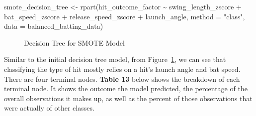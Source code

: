 \documentclass[
  letterpaper,
  DIV=11,
  numbers=noendperiod]{scrartcl}
\newenvironment{Shaded}{\begin{snugshade}}{\end{snugshade}}
\newcommand{\AttributeTok}[1]{\textcolor[rgb]{0.40,0.45,0.13}{#1}}
\newcommand{\FunctionTok}[1]{\textcolor[rgb]{0.28,0.35,0.67}{#1}}
\newcommand{\NormalTok}[1]{\textcolor[rgb]{0.00,0.23,0.31}{#1}}
\newcommand{\OtherTok}[1]{\textcolor[rgb]{0.00,0.23,0.31}{#1}}
\newcommand{\SpecialCharTok}[1]{\textcolor[rgb]{0.37,0.37,0.37}{#1}}
\newcommand{\StringTok}[1]{\textcolor[rgb]{0.13,0.47,0.30}{#1}}
\begin{document}
\begin{Shaded}
\begin{Highlighting}[]
\NormalTok{smote\_decision\_tree }\OtherTok{\textless{}{-}} \FunctionTok{rpart}\NormalTok{(hit\_outcome\_factor }\SpecialCharTok{\textasciitilde{}}
\NormalTok{                               swing\_length\_zscore }\SpecialCharTok{+}
\NormalTok{                               bat\_speed\_zscore }\SpecialCharTok{+}
\NormalTok{                               release\_speed\_zscore }\SpecialCharTok{+}
\NormalTok{                               launch\_angle,}
                             \AttributeTok{method =} \StringTok{"class"}\NormalTok{,}
                             \AttributeTok{data =}\NormalTok{ balanced\_batting\_data)}
\end{Highlighting}
\end{Shaded}

\begin{figure}[H]


\caption{\label{fig-dec-tree-smote}Decision Tree for SMOTE Model}

\end{figure}%

Similar to the initial decision tree model, from
Figure~\ref{fig-dec-tree-smote}, we can see that classifying the type of
hit mostly relies on a hit's launch angle and bat speed. There are four
terminal nodes. \textbf{Table 13} below shows the breakdown of each
terminal node. It shows the outcome the model predicted, the percentage
of the overall observations it makes up, as well as the percent of those
observations that were actually of other classes.
\end{document}
